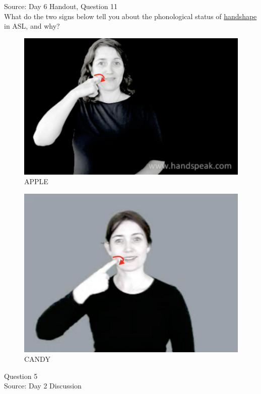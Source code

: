 \documentclass[12pt]{article}
\begin{document}
Source: Day 6 Handout, Question 11\\

What do the two signs below tell you about the phonological status of \underline{handshape} in ASL, and why?\\

\begin{figure}[H]
\includegraphics{../images/asl_apple.png}
\caption{APPLE}
\end{figure}
\begin{figure}[H]
\includegraphics{../images/asl_candy.png}
\caption{CANDY}
\end{figure}

\newpage

{\large Question 5}\\

Source: Day 2 Discussion\\
\end{document}
